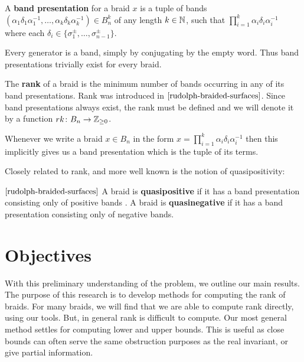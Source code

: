 \documentclass[12pt]{thesis}
\begin{document}
\begin{definition}
    A \textbf{band presentation} for a braid $x$ is a tuple of bands $(\alpha_{1}\delta_{1}\alpha_{1}^{-1},
    \ldots, \alpha_{k}\delta_{k}\alpha_{k}^{-1}) \in B_{n}^{k}$
    of any length $k \in \mathbb{N}$,
    such that $\prod_{i=1}^{k} \alpha_{i} \delta_{i} \alpha_{i}^{-1}$
    where each $\delta_{i} \in \{ \sigma_{1}^{\pm} ,\ldots, \sigma_{n-1}^{\pm} \}$.
\end{definition}

Every generator is a band, simply by conjugating by the empty word.
Thus band presentations trivially exist for every braid.
\begin{definition}
    The \textbf{rank} of a braid is the minimum number of bands
    occurring in any of its band presentations. 
    Rank was introduced in $\cite{rudolph-braided-surfaces}$.
    Since band presentations always exist,
    the rank must be defined and we will denote it by a function $rk \colon B_{n} \rightarrow \mathbb{Z}_{\geq 0}$.
\end{definition}

Whenever we write a braid $x \in B_{n}$ in the form $x = \prod_{i=1}^{k} \alpha_{i} \delta_{i} \alpha_{i}^{-1}$
then this implicitly gives us a band presentation which is the tuple of its terms.

Closely related to rank, and more well known is the notion of quasipositivity:
\begin{definition} $\cite{rudolph-braided-surfaces}$
    A braid is \textbf{quasipositive} if it has a
    band presentation consisting only of positive bands .
    A braid is \textbf{quasinegative} if it has a band
    presentation consisting only of negative bands.
\end{definition}

\section{Objectives}

With this preliminary understanding of the problem, we outline our main results.
The purpose of this research is to develop methods for computing the rank of braids.
For many braids, we will find that we are able to compute rank directly, using
our tools.
But, in general rank is difficult to compute.
Our most general method settles for computing lower and upper bounds.
This is useful
as close bounds can often serve the same obstruction
purposes as the real invariant,
or give partial information.
\end{document}
